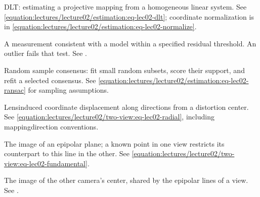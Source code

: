 \documentclass[letterpaper,11pt,english,openany,oneside]{jupyterBook}
\begin{document}
\begin{description}
\sphinxAtStartPar
DLT: estimating a projective mapping from a homogeneous linear system. See \eqref{equation:lectures/lecture02/estimation:eq-lec02-dlt}; coordinate normalization is in \eqref{equation:lectures/lecture02/estimation:eq-lec02-normalize}.

\sphinxAtStartPar
A measurement consistent with a model within a specified residual threshold. An outlier fails that test. See {\hyperref[\detokenize{lectures/lecture02/estimation:lec02-estimation}]{}}.

\sphinxAtStartPar
Random sample consensus: fit small random subsets, score their support, and refit a selected consensus. See \eqref{equation:lectures/lecture02/estimation:eq-lec02-ransac} for sampling assumptions.

\sphinxAtStartPar
Lens\sphinxhyphen{}induced coordinate displacement along directions from a distortion center. See \eqref{equation:lectures/lecture02/two-view:eq-lec02-radial}, including mapping\sphinxhyphen{}direction conventions.

\sphinxAtStartPar
The image of an epipolar plane; a known point in one view restricts its counterpart to this line in the other. See \eqref{equation:lectures/lecture02/two-view:eq-lec02-fundamental}.

\sphinxAtStartPar
The image of the other camera’s center, shared by the epipolar lines of a view. See {\hyperref[\detokenize{lectures/lecture02/two-view:lec02-two-view}]{}}.


\end{description}
\end{document}

